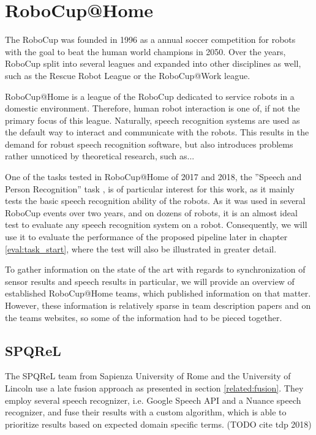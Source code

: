 
\section{RoboCup@Home}
The RoboCup was founded in 1996 as a annual soccer competition for robots with the goal to beat the human world champions in 2050.
Over the years, RoboCup split into several leagues and expanded into other disciplines as well, such as the Rescue Robot League or the RoboCup@Work league.

RoboCup@Home is a league of the RoboCup dedicated to service robots in a domestic environment. %
Therefore, human robot interaction is one of, if not the primary focus of this league.
Naturally, speech recognition systems are used as the default way to interact and communicate with the robots.
This results in the demand for robust speech recognition software, but also introduces problems rather unnoticed by theoretical research, such as...

One of the tasks tested in RoboCup@Home of 2017 and 2018, the ''Speech and Person Recognition'' task \cite{rulebook_2018}, is of particular interest for this work, as it mainly tests the basic speech recognition ability of the robots. 
As it was used in several RoboCup events over two years, and on dozens of robots, it is an almost ideal test to evaluate any speech recognition system on a robot.
Consequently, we will use it to evaluate the performance of the proposed pipeline later in chapter \ref{eval:task_start}, where the test will also be illustrated in greater detail. 

To gather information on the state of the art with regards to synchronization of sensor results and speech results in particular, we will provide an overview of established RoboCup@Home teams, which published information on that matter.
However, these information is relatively sparse in team description papers and on the teams websites, so some of the information had to be pieced together.

\subsection{SPQReL}
The SPQReL team from Sapienza University of Rome and the University of Lincoln use a late fusion approach as presented in section \ref{related:fusion}.
They employ several speech recognizer, i.e. Google Speech API and a Nuance speech recognizer, and fuse their results with a custom algorithm, which is able to prioritize results based on expected domain specific terms. (TODO cite tdp 2018)

